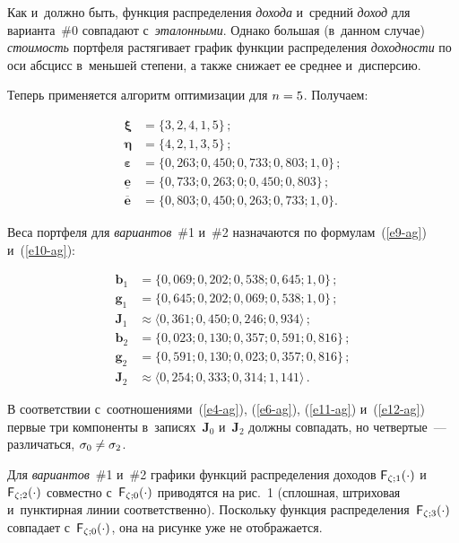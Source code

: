 \begin{multicols}{2}
  Как и~должно быть, функция распределения \textit{дохода} и~средний 
\textit{доход} для варианта~\#0 совпадают с~\textit{эталонными}. Однако 
большая (в~данном случае) \textit{стоимость} портфеля растягивает график 
функции распределения \textit{доходности} по оси абсцисс в~меньшей степени, 
а также снижает ее среднее и~дис\-пер\-сию. 
  
  Теперь применяется алгоритм оптимизации для $n\hm=5$. Получаем: 
  
  \noindent
  \begin{align*}
  {\boldsymbol\xi}&= \{ 3, 2, 4, 1, 5\}\,;\\
   \boldsymbol{\eta}&=\{4, 2, 1, 3, 5\}\,;\\
  \boldsymbol{\varepsilon}&=\{0{,}263; 0{,}450; 0{,}733; 0{,}803; 1{,}0\}\,; \\
  \underline{\mathbf{e}}&=\{0{,}733; 0{,}263; 0; 0{,}450; 0{,}803\}\,;\\
  \overline{\mathbf{e}}&=\{0{,}803; 0{,}450; 0{,}263; 0{,}733; 1{,}0\}.
  \end{align*}
  
  Веса портфеля для \textit{вариантов}~\#1 и~\#2 назначаются по 
формулам~(\ref{e9-ag}) и~(\ref{e10-ag}): 

\noindent
  \begin{align*}
  \mathbf{b}_1&= \{0{,}069; 0{,}202; 0{,}538; 0{,}645; 1{,}0\}\,;\\
  \mathbf{g}_1&= \{0{,}645; 0{,}202; 0{,}069; 0{,}538; 1{,}0\}\,; \\
  \mathbf{J}_1&\approx \langle 0{,}361; 0{,}450; 0{,}246; 0{,}934\rangle\,; \\
  \mathbf{b}_2&= \{0{,}023; 0{,}130; 0{,}357; 0{,}591; 0{,}816\}\,; \\
  \mathbf{g}_2&=\{0{,}591; 0{,}130; 0{,}023; 0{,}357; 0{,}816\}\,; \\
  \mathbf{J}_2 &\approx \langle 0{,}254; 0{,}333; 0{,}314; 1{,}141\rangle\,. 
  \end{align*}
  
  В соответствии с~соотношениями~(\ref{e4-ag}), (\ref{e6-ag}), (\ref{e11-ag}) 
и~(\ref{e12-ag}) первые три компоненты в~записях~$\mathbf{J}_0$ 
и~$\mathbf{J}_2$ должны совпадать, но 
 четвертые~--- различаться, $\sigma_0\hm\not=\sigma_2$. 
 
 
  
  Для \textit{вариантов}~\#1 и~\#2 графики функций распределения доходов 
${\sf F}_{\zeta;1}(\cdot)$ и~${\sf F}_{\zeta;2}(\cdot)$ совместно  
с~${\sf F}_{\zeta;0}(\cdot)$ приводятся на рис.~1 (сплошная, штриховая 
и~пунктирная линии соответственно). Поскольку функция распределения~${\sf 
F}_{\zeta;3}(\cdot)$ совпадает с~${\sf F}_{\zeta;0}(\cdot)$, она на рисунке уже не 
отображается. 


\end{multicols}
